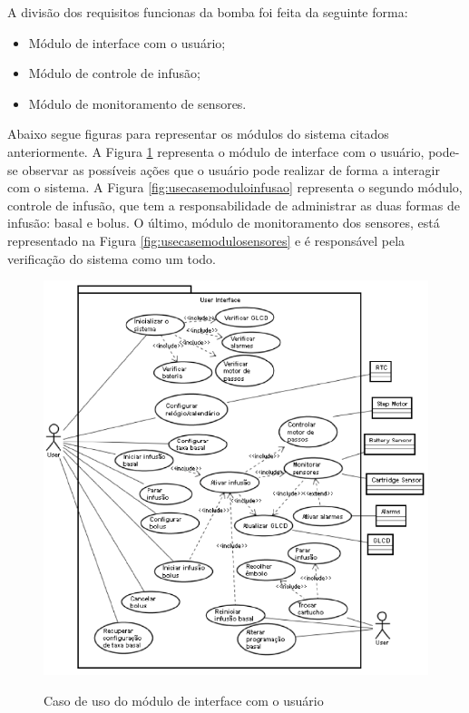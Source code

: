 A divisão dos requisitos funcionas da bomba foi feita da seguinte forma:
\begin{itemize}
\item Módulo de interface com o usuário;
\item Módulo de controle de infusão;
\item Módulo de monitoramento de sensores.
\end{itemize}

Abaixo segue figuras para representar os módulos do sistema citados anteriormente. A Figura \ref{fig:usecaseinterfaceusuario} representa o módulo de interface com o usuário, pode-se observar as possíveis ações que o usuário pode realizar de forma a interagir com o sistema. A Figura \ref{fig:usecasemoduloinfusao} representa o segundo módulo, controle de infusão, que tem a responsabilidade de administrar as duas formas de infusão: basal e bolus. O último, módulo de monitoramento dos sensores, está representado na Figura \ref{fig:usecasemodulosensores} e é responsável pela verificação do sistema como um todo.

\begin{figure}[htp]
	\centering
	\includegraphics[scale=0.8]{images/caso_uso_interface_usuario.png}
	\caption{Caso de uso do módulo de interface com o usuário}	
	\label{fig:usecaseinterfaceusuario}
	\cite{galvao2013requirements}
\end{figure}

